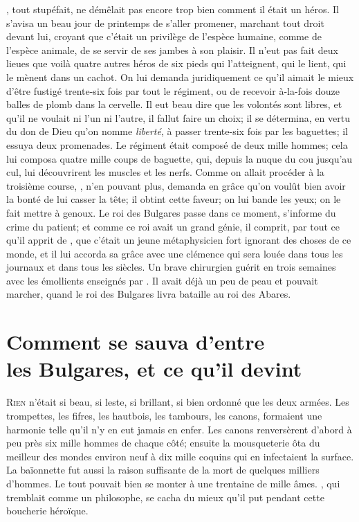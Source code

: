 , tout stupéfait, ne démêlait pas encore trop bien comment il
était un héros. Il s’avisa un beau jour de printemps de s’aller
promener, marchant tout droit devant lui, croyant que c’était un
privilège de l’espèce humaine, comme de l’espèce animale, de se servir
de ses jambes à son plaisir. Il n’eut pas fait deux lieues que voilà
quatre autres héros de six pieds qui l’atteignent, qui le lient, qui le
mènent dans un cachot. On lui demanda juridiquement ce qu’il aimait le
mieux d’être fustigé trente-six fois par tout le régiment, ou de
recevoir à-la-fois douze balles de plomb dans la cervelle. Il eut beau
dire que les volontés sont libres, et qu’il ne voulait ni l’un ni
l’autre, il fallut faire un choix; il se détermina, en vertu du don de
Dieu qu’on nomme \textit{liberté}, à passer trente-six fois par les baguettes;
il essuya deux promenades. Le régiment était composé de deux mille
hommes; cela lui composa quatre mille coups de baguette, qui, depuis la
nuque du cou jusqu’au cul, lui découvrirent les muscles et les nerfs.
Comme on allait procéder à la troisième course, , n’en pouvant
plus, demanda en grâce qu’on voulût bien avoir la bonté de lui casser
la tête; il obtint cette faveur; on lui bande les yeux; on le fait
mettre à genoux. Le roi des Bulgares passe dans ce moment, s’informe du
crime du patient; et comme ce roi avait un grand génie, il comprit, par
tout ce qu’il apprit de , que c’était un jeune métaphysicien
fort ignorant des choses de ce monde, et il lui accorda sa grâce avec
une clémence qui sera louée dans tous les journaux et dans tous les
siècles. Un brave chirurgien guérit  en trois semaines avec les
émollients enseignés par . Il avait déjà un peu de peau et
pouvait marcher, quand le roi des Bulgares livra bataille au roi des
Abares.



\chapter[Comment \bname{Candide} se sauva…]{Comment  se sauva d’entre\\ les Bulgares, et ce qu’il devint}


\lettrine{R}{ien} n’était si beau, si leste, si brillant, si bien ordonné que les
deux armées. Les trompettes, les fifres, les hautbois, les tambours,
les canons, formaient une harmonie telle qu’il n’y en eut jamais en
enfer. Les canons renversèrent d’abord à peu près six mille hommes de
chaque côté; ensuite la mousqueterie ôta du meilleur des mondes environ
neuf à dix mille coquins qui en infectaient la surface. La baïonnette
fut aussi la raison suffisante de la mort de quelques milliers
d’hommes. Le tout pouvait bien se monter à une trentaine de mille âmes.
, qui tremblait comme un philosophe, se cacha du mieux qu’il put
pendant cette boucherie héroïque.

